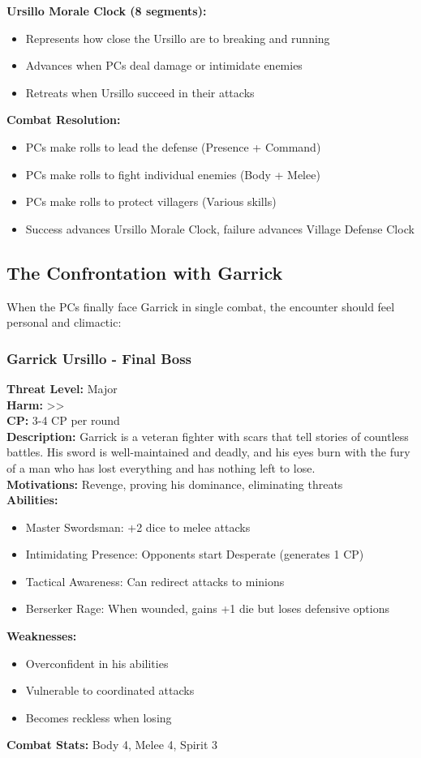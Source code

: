 \documentclass[11pt]{article}
\newenvironment{encounterbox}[1]{%
  \begin{mdframed}[backgroundcolor=encountercolor!30, linewidth=1pt, linecolor=accentcolor]%
  \subsubsection*{#1}%
}{%
  \end{mdframed}%
}
\begin{document}
\textbf{Ursillo Morale Clock (8 segments):}
\begin{itemize}
\item Represents how close the Ursillo are to breaking and running
\item Advances when PCs deal damage or intimidate enemies
\item Retreats when Ursillo succeed in their attacks
\end{itemize}

\textbf{Combat Resolution:}
\begin{itemize}
\item PCs make rolls to lead the defense (Presence + Command)
\item PCs make rolls to fight individual enemies (Body + Melee)
\item PCs make rolls to protect villagers (Various skills)
\item Success advances Ursillo Morale Clock, failure advances Village Defense Clock
\end{itemize}

\subsection{The Confrontation with Garrick}

When the PCs finally face Garrick in single combat, the encounter should feel personal and climactic:

\begin{encounterbox}{Garrick Ursillo - Final Boss}
\textbf{Threat Level:} Major \\
\textbf{Harm:} \textgreater\textgreater \\
\textbf{CP:} 3-4 CP per round \\
\textbf{Description:} Garrick is a veteran fighter with scars that tell stories of countless battles. His sword is well-maintained and deadly, and his eyes burn with the fury of a man who has lost everything and has nothing left to lose. \\
\textbf{Motivations:} Revenge, proving his dominance, eliminating threats \\
\textbf{Abilities:}
\begin{itemize}
    \item Master Swordsman: +2 dice to melee attacks
    \item Intimidating Presence: Opponents start Desperate (generates 1 CP)
    \item Tactical Awareness: Can redirect attacks to minions
    \item Berserker Rage: When wounded, gains +1 die but loses defensive options
\end{itemize}
\textbf{Weaknesses:}
\begin{itemize}
    \item Overconfident in his abilities
    \item Vulnerable to coordinated attacks
    \item Becomes reckless when losing
\end{itemize}
\textbf{Combat Stats:} Body 4, Melee 4, Spirit 3
\end{encounterbox}
\end{document}
